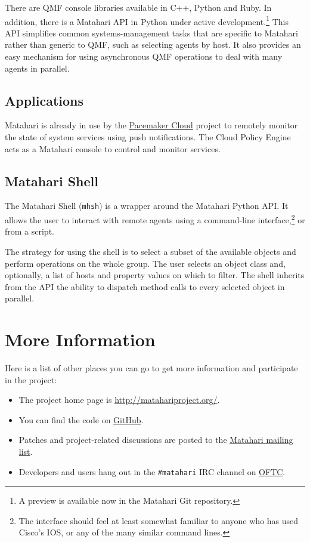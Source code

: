 \documentclass{tufte-handout}
\begin{document}
There are QMF console libraries available in C++, Python and Ruby.
In addition, there is a Matahari API in Python under active development.\footnote{A preview is available now in the Matahari Git repository.} This API simplifies common systems-management tasks that are specific to Matahari rather than generic to QMF, such as selecting agents by host. It also provides an easy mechanism for using asynchronous QMF operations to deal with many agents in parallel.

\subsection{Applications}

Matahari is already in use by the \href{http://pacemaker-cloud.org/}{Pacemaker Cloud} project to remotely monitor the state of system services using push notifications. The Cloud Policy Engine acts as a Matahari console to control and monitor services.

\subsection{Matahari Shell}

The Matahari Shell (\texttt{mhsh}) is a wrapper around the Matahari Python API. It allows the user to interact with remote agents using a command-line interface,\footnote{The interface should feel at least somewhat familiar to anyone who has used Cisco's IOS, or any of the many similar command lines.} or from a script.

The strategy for using the shell is to select a subset of the available objects and perform operations on the whole group.
The user selects an object class and, optionally, a list of hosts and property values on which to filter.
The shell inherits from the API the ability to dispatch method calls to every selected object in parallel.

\section{More Information}

Here is a list of other places you can go to get more information and participate in the project:

\begin{itemize}
\item The project home page is \url{http://matahariproject.org/}.
\item You can find the code on \href{https://github.com/matahari/matahari}{GitHub}.
\item Patches and project-related discussions are posted to the \href{https://fedorahosted.org/mailman/listinfo/matahari}{Matahari mailing list}.
\item Developers and users hang out in the \texttt{\#matahari} IRC channel on \href{http://www.oftc.net/}{OFTC}.
\end{itemize}
\end{document}

